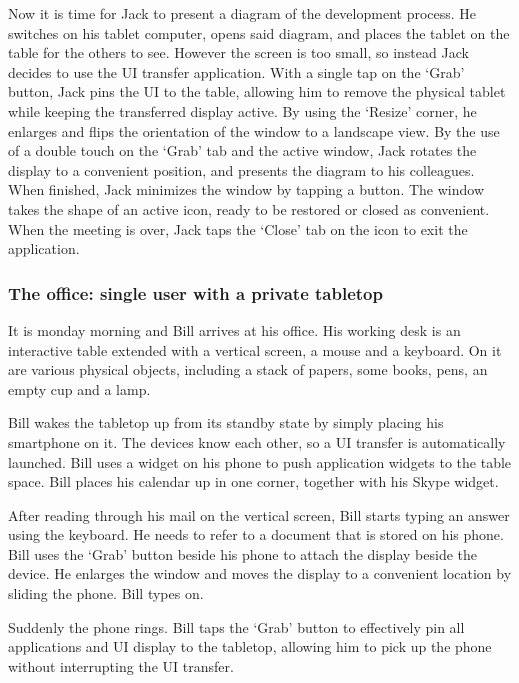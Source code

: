 Now it is time for Jack to present a diagram of the development process. 
He switches on his tablet computer, opens said diagram, and places the tablet on the table for the others to see. 
However the screen is too small, so instead Jack decides to use the UI transfer application. 
With a single tap on the `Grab' button, Jack pins the UI to the table, allowing him to remove the physical tablet while keeping the transferred display active. 
By using the `Resize' corner, he enlarges and flips the orientation of the window to a landscape view. 
By the use of a double touch on the `Grab' tab and the active window, Jack rotates the display to a convenient position, and presents the diagram to his colleagues. 
When finished, Jack minimizes the window by tapping a button. 
The window takes the shape of an active icon, ready to be restored or closed as convenient. 
When the meeting is over, Jack taps the `Close' tab on the icon to exit the application.

\subsubsection*{The office: single user with a private tabletop}

It is monday morning and Bill arrives at his office. 
His working desk is an interactive table extended with a vertical screen, a mouse and a keyboard. 
On it are various physical objects, including a stack of papers, some books, pens, an empty cup and a lamp.

Bill wakes the tabletop up from its standby state by simply placing his smartphone on it. 
The devices know each other, so a UI transfer is automatically launched. 
Bill uses a widget on his phone to push application widgets to the table space. 
Bill places his calendar up in one corner, together with his Skype widget.

After reading through his mail on the vertical screen, Bill starts typing an answer using the keyboard. 
He needs to refer to a document that is stored on his phone. 
Bill uses the `Grab' button beside his phone to attach the display beside the device. 
He enlarges the window and moves the display to a convenient location by sliding the phone. 
Bill types on.

Suddenly the phone rings. 
Bill taps the `Grab' button to effectively pin all applications and UI display to the tabletop, allowing him to pick up the phone without interrupting the UI transfer.
